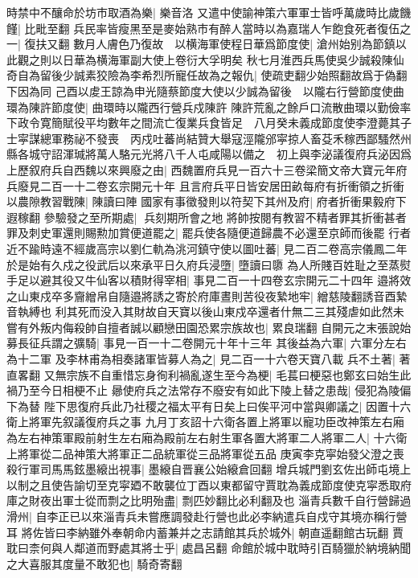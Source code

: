 時禁中不釀命於坊市取酒為樂|{
	樂音洛}
又遣中使諭神策六軍軍士皆呼萬歲時比歲饑饉|{
	比毗至翻}
兵民率皆瘦黑至是麥始熟市有醉人當時以為嘉瑞人乍飽食死者復伍之一|{
	復扶又翻}
數月人膚色乃復故　以横海軍使程日華爲節度使|{
	滄州始别為節鎮以此觀之則以日華為横海軍副大使上卷衍大孚明矣}
秋七月淮西兵馬使吳少誠殺陳仙奇自為留後少誠素狡險為李希烈所寵任故為之報仇|{
	使疏吏翻少始照翻故爲于偽翻下因為同}
己酉以䖍王諒為申光隨蔡節度大使以少誠為留後　以隴右行營節度使曲環為陳許節度使|{
	曲環時以隴西行營兵戍陳許}
陳許荒亂之餘戶口流散曲環以勤儉率下政令寛簡賦役平均數年之間流亡復業兵食皆足　八月癸未義成節度使李澄薨其子士寜謀總軍務祕不發喪　丙戍吐蕃尚結贊大舉寇涇隴邠寜掠人畜芟禾稼西鄙騷然州縣各城守詔渾瑊將萬人駱元光將八千人屯咸陽以備之　初上與李泌議復府兵泌因爲上歷叙府兵自西魏以來興廢之由|{
	西魏置府兵見一百六十三卷梁簡文帝大寶元年府兵廢見二百一十二卷玄宗開元十年}
且言府兵平日皆安居田畝每府有折衝領之折衝以農隙教習戰陳|{
	陳讀曰陣}
國家有事徵發則以符契下其州及府|{
	府者折衝果毅府下遐稼翻}
參驗發之至所期處|{
	兵刻期所會之地}
將帥按閱有教習不精者罪其折衝甚者罪及刺史軍還則賜勲加賞便道罷之|{
	罷兵使各隨便道歸農不必還至京師而後罷}
行者近不踰時遠不經歲高宗以劉仁軌為洮河鎮守使以圖吐蕃|{
	見二百二卷高宗儀鳳二年}
於是始有久戍之役武后以來承平日久府兵浸墮|{
	墮讀曰隳}
為人所賤百姓耻之至蒸熨手足以避其役又牛仙客以積財得宰相|{
	事見二百一十四卷玄宗開元二十四年}
邉將效之山東戍卒多齎繒帛自隨邉將誘之寄於府庫晝則苦役夜縶地牢|{
	繒慈陵翻誘音酉縶音執縛也}
利其死而没入其財故自天寶以後山東戍卒還者什無二三其殘虐如此然未嘗有外叛内侮殺帥自擅者誠以顧戀田園恐累宗族故也|{
	累良瑞翻}
自開元之末張說始募長征兵謂之彍騎|{
	事見一百一十二卷開元十年十三年}
其後益為六軍|{
	六軍分左右為十二軍}
及李林甫為相奏諸軍皆募人為之|{
	見二百一十六卷天寶八載}
兵不土著|{
	著直畧翻}
又無宗族不自重惜忘身徇利禍亂遂生至今為梗|{
	毛萇曰梗惡也鄭玄曰始生此禍乃至今日相梗不止}
曏使府兵之法常存不廢安有如此下陵上替之患哉|{
	侵犯為陵偏下為替}
陛下思復府兵此乃社稷之福太平有日矣上曰俟平河中當與卿議之|{
	因置十六衛上將軍先叙議復府兵之事}
九月丁亥詔十六衛各置上將軍以寵功臣改神策左右廂為左右神策軍殿前射生左右廂為殿前左右射生軍各置大將軍二人將軍二人|{
	十六衛上將軍從二品神策大將軍正二品統軍從三品將軍從五品}
庚寅李克寜始發父澄之喪殺行軍司馬馬鉉墨縗出視事|{
	墨縗自晋襄公始縗倉回翻}
增兵城門劉玄佐出師屯境上以制之且使告諭切至克寜廼不敢襲位丁酉以東都留守賈耽為義成節度使克寜悉取府庫之財夜出軍士從而剽之比明殆盡|{
	剽匹妙翻比必利翻及也}
淄青兵數千自行營歸過滑州|{
	自李正已以來淄青兵未嘗應調發赴行營也此必李納遣兵自戍守其境亦稱行營耳}
將佐皆曰李納雖外奉朝命内蓄兼并之志請館其兵於城外|{
	朝直遥翻館古玩翻}
賈耽曰柰何與人鄰道而野處其將士乎|{
	處昌呂翻}
命館於城中耽時引百騎獵於納境納聞之大喜服其度量不敢犯也|{
	騎奇寄翻}
